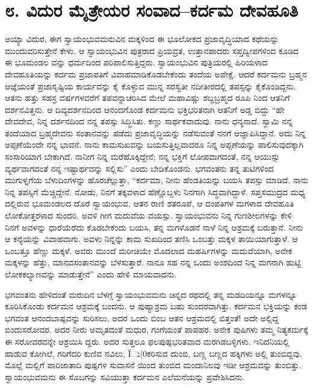 
\chapter{೮. ವಿದುರ ಮೈತ್ರೇಯರ ಸಂವಾದ–ಕರ್ದಮ ದೇವಹೂತಿ}

ಅಯ್ಯಾ ವಿದುರ, ಈಗ ಸ್ವಾಯಂಭುವಮನುವಿನ ಮಕ್ಕಳಿಂದ ಈ ಭೂಲೋಕದ ಪ್ರಜಾವೃದ್ಧಿಯಾದ ಕಥೆಯನ್ನು ಮುಂದುವರಿಸುತ್ತೇನೆ ಕೇಳು. ಆ ಸ್ವಾಯಂಭುವಿನ ಪುತ್ರರಾದ ಪ್ರಿಯವ್ರತ, ಉತ್ತಾನಪಾದರು ಸಪ್ತದ್ವೀಪಗಳಿಂದ ಕೂಡಿದ ಈ ಭೂಮಂಡಲ ವನ್ನು ಧರ್ಮದಿಂದ ಪರಿಪಾಲಿಸುತ್ತಿದ್ದರು. ಸ್ವಾಯಂಭುವಿನ ಪುತ್ರಿಯರಲ್ಲಿ ಹಿರಿಯಳಾದ ದೇವಹೂತಿಯನ್ನು ಕರ್ದಮ ಪ್ರಜಾಪತಿಗೆ ವಿವಾಹಮಾಡಿಕೊಡಬೇಕೆಂದು ತಂದೆಯ ಅಪೇಕ್ಷೆ. ಆದರೆ ಕರ್ದಮನು ಬ್ರಹ್ಮನ ಆಜ್ಞೆಯಂತೆ ಪ್ರಜಾಸೃಷ್ಟಿಯ ಕಾರ್ಯವನ್ನು ಕೈ ಕೊಳ್ಳುವ ಮುನ್ನ ಸರಸ್ವತೀ ನದೀತೀರದಲ್ಲಿ ತಪಸ್ಸನ್ನು ಕೈಕೊಂಡಿದ್ದನು. ಆತನು ಹತ್ತು ಸಹಸ್ರ ವರ್ಷಗಳವರೆಗೆ ತಪವನ್ನಾಚರಿಸಿದ ಮೇಲೆ ಮಹಾವಿಷ್ಣು ಶಬ್ದಬ್ರಹ್ಮದ ರೂಪಿ ನಿಂದ ಆತನಿಗೆ ದರ್ಶನವಿತ್ತನು. ಆ ದಿವ್ಯದರ್ಶನದಿಂದ ಆನಂದಗೊಂಡ ಕರ್ದಮನು ಭಕ್ತಿಭರಿತನಾಗಿ ಆತನಿಗೆ ಅಡ್ಡ ಬಿದ್ದು “ಹೇ ದೇವದೇವ, ನಿನ್ನ ದರ್ಶನದಿಂದ ನನ್ನ ತಪಸ್ಸು ಸಿದ್ಧಿಸಿತು. ಕಣ್ಣು ಸಾರ್ಥಕವಾದುವು. ನಾನು ಧನ್ಯನಾದೆ. ಸ್ವಾಮಿ ನನ್ನ ತಂದೆಯಾದ ಬ್ರಹ್ಮದೇವನು ಸಂತಾನವನ್ನು ಪಡೆದು ಪ್ರಜಾವೃದ್ಧಿಯನ್ನು ನಡೆಸುವಂತೆ ನನಗೆ ಆಜ್ಞಾಪಿಸಿದ್ದಾನೆ. ಅದು ನಿನ್ನ ಅಪ್ಪಣೆಯೆಂದೇ ನನ್ನ ಭಾವನೆ. ನಾನು ಕಾಮಸುಖವನ್ನು ಬಯಸುತ್ತಿಲ್ಲವಾದರೂ ನಿನ್ನ ಅಪ್ಪಣೆಯನ್ನು ಪಾಲಿಸುವುದಕ್ಕಾಗಿ ಸಂಸಾರಿಯಾಗ ಬೇಕಾಗಿದೆ. ನಾನೀಗ ನಿನ್ನ ಮರೆಹೊಕ್ಕಿದ್ದೇನೆ; ನನ್ನ ಭಕ್ತಿಗೆ ಲೋಪವಾಗದಂತೆ, ನನ್ನ ಆಯುಸ್ಸು ವ್ಯರ್ಥವಾಗದಂತೆ ನನ್ನ ಇಷ್ಟಾರ್ಥವನ್ನು ಸಲ್ಲಿಸು” ಎಂದು ಬೇಡಿಕೊಂಡನು. ಭಗವಂತನು ತನ್ನ ತುಟಿಗಳಿಂದ ಮುಗುಳ್ನಗೆಯ ಬೆಳುದಿಂಗಳನ್ನು ಹೊರಚೆಲ್ಲುತ್ತಾ, “ಕರ್ದಮಾ, ನೀನು ಹೆಂಡತಿಯನ್ನು ಬಯಸಿ ತಪಸ್ಸು ಮಾಡಿದೆ. ನಾನು ನಿನ್ನ ತಪಸ್ಸಿಗೆ ಮೆಚ್ಚಿದ್ದೇನೆ. ನೋಡು, ನಿನಗೆ ತಕ್ಕವಳಾದ ಹೆಣ್ಣೊಬ್ಬಳು ನಿನಗಾಗಿ ಸಿದ್ಧವಾಗಿದ್ದಾಳೆ. ಸಪ್ತಸಮುದ್ರದ ಮಧ್ಯ ದಲ್ಲಿರುವ ಭೂಮಂಡಲದ ದೊರೆ ಸ್ವಾಯಂಭುವ, ಆತನ ರಾಣಿ ಶತರೂಪೆ, ಆ ದಂಪತಿಗಳ ಮಗಳಾದ ದೇವಹೂತಿ ಲೋಕೋತ್ತರಳಾದ ಸುಂದರಿ. ಅವಳಿ ಗೀಗ ಮದುವೆಯ ವಯಸ್ಸು. ಸ್ವಾಯಂಭುವನು ನಿನ್ನ ಗುಣಶೀಲಗಳನ್ನು ಕೇಳಿ ನಿನಗೆ ಅವಳನ್ನು ಧಾರೆಯೆರೆದು ಕೊಡಬೇಕೆಂದು ಬಯಸಿ, ತನ್ನ ಮಗಳೊಡನೆ ನಾಳೆ ನಿನ್ನ ಆಶ್ರಮಕ್ಕೆ ಬರುತ್ತಾನೆ. ನೀನು ಆ ಕನ್ಯೆಯನ್ನು ವಿವಾಹವಾಗು. ಅವಳು ನಿನ್ನನ್ನು ಕಾಮ ಸುಖದಿಂದ ತಣಿಸಿ ಒಂಬತ್ತು ಮಕ್ಕಳ ತಾಯಿಯಾಗುತ್ತಾಳೆ. ಆ ಒಂಬತ್ತೂ ಹೆಣ್ಣು ಮಕ್ಕಳೆ. ಅವರು ಮುಂದೆ ಮರೀಚಿಯೇ ಮೊದಲಾದ ಮಹರ್ಷಿಗಳನ್ನು ಮದುವೆಯಾಗಿ, ಅನೇಕ ಮಕ್ಕಳನ್ನು ಹೆತ್ತು, ಮಾನವಸಂತಾನವನ್ನು ಬೆಳಸುತ್ತಾರೆ. ನಾನೂ ಸಹ ನನ್ನ ಒಂದು ಅಂಶದಿಂದ ನಿನ್ನ ಮಗನಾಗಿ ಹುಟ್ಟಿ ಲೋಕಕಲ್ಯಾಣವನ್ನು ಮಾಡುತ್ತೇನೆ” ಎಂದು ಹೇಳಿ ಮಾಯವಾದನು.

ಭಗವಂತನು ಹೇಳಿದಂತೆ ಮರುದಿನ ಬೆಳಗ್ಗೆ ಸ್ವಾಯಂಭುವಮನು ಚಿನ್ನದ ರಥದಲ್ಲಿ ತನ್ನ ಮಡದಿಯನ್ನೂ ಮಗಳನ್ನೂ ಕೂರಿಸಿಕೊಂಡು ಕರ್ದಮನ ಆಶ್ರಮಕ್ಕೆ ಬಂದನು. ಆ ಪುಷ್ಯಾಶ್ರಮ ಬಹು ಸುಂದರವಾಗಿತ್ತು. ಕರ್ದಮನ ಭಕ್ತಿಯನ್ನು ಕಂಡ ಭಗವಂತ ಆನಂದಬಾಷ್ಪವನ್ನು ಸುರಿಸಲು, ಅದರ ಒಂದು ಬಿಂಬ ಆತನ ಆಶ್ರಮದಲ್ಲಿ ಬಿತ್ತಂತೆ! ಅದೇ ಅಲ್ಲಿದ್ದ ಬಿಂದುಸರೋವರ. ಅದರ ನೀರು ಅಮೃತದಂತೆ ಮಧುರ, ಗಂಗೆಯಂತೆ ಪಾಪಹರ. ಅನೇಕ ಪುಷಿಗಳು ತಮ್ಮ ನಿತ್ಯಕರ್ಮಕ್ಕೆ ಈ ಸರೋವರವನ್ನೇ ಆಶ್ರಯಿಸಿ ದ್ದರು. ಅದರ ಸುತ್ತಲೂ ಫಲಪುಷ್ಪಭರಿತವಾದ ಮರಗಿಡಬಳ್ಳಿಗಳು. ಇನಿದನಿಯಲ್ಲಿ ಹಾಡುವ ಕೋಗಿಲೆ, ಗರಿಗೆದರಿ ಕುಣಿವ ನವಿಲು, Ïು|0ಕರಿಸುವ ದುಂಬಿ, ಬಣ್ಣ ಬಣ್ಣದ ಹಕ್ಕಿಗಳು ಅಲ್ಲಿ ತುಂಬಿದ್ದವು. ಮೊಲ್ಲೆ ಮಲ್ಲಿಗೆ ಪಾರಿಜಾತಾದಿ ಪುಷ್ಪಗಳ ಸುವಾಸನೆ ಯಿಂದ ತುಂಬಿದ ಮಂದಾನಿಲವು ಇಡೀ ಆಶ್ರಮವನ್ನು ತುಂಬಿತ್ತು. ಸ್ವಾಯಂಭುವಮನು ಈ ಸೊಬಗನ್ನು ಸವಿಯುತ್ತಾ ಕರ್ದಮನ ಎಲೆಮನೆಯನ್ನು ಪ್ರವೇಶಿಸಿದನು.

